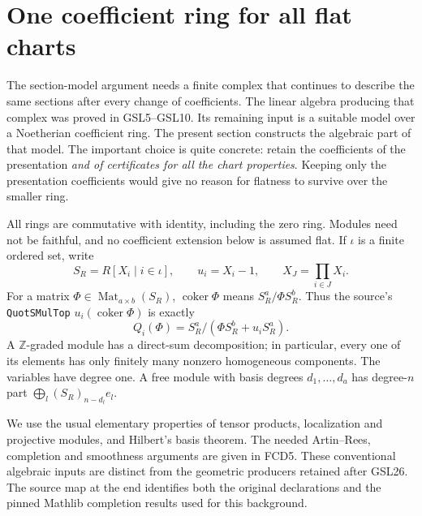 \section{One coefficient ring for all flat charts}
\label{sec:flat-chart-descent-v053}


The section-model argument needs a finite complex that continues to
describe the same sections after every change of coefficients.  The
linear algebra producing that complex was proved in GSL5--GSL10.  Its
remaining input is a suitable model over a Noetherian coefficient ring.
The present section constructs the algebraic part of that model.
The important choice is quite concrete: retain the coefficients of the
presentation \emph{and of certificates for all the chart properties}.
Keeping only the presentation coefficients would give no reason for
flatness to survive over the smaller ring.

All rings are commutative with identity, including the zero ring.
Modules need not be faithful, and no coefficient extension below is
assumed flat.  If $\iota$ is a finite ordered set, write
\[
 S_R=R[X_i\mid i\in\iota],\qquad
 u_i=X_i-1,\qquad X_J=\prod_{i\in J}X_i.
\]
For a matrix $\Phi\in\operatorname{Mat}_{a\times b}(S_R)$,
$\operatorname{coker}\Phi$ means
$S_R^a/\Phi S_R^b$.  Thus the source's
\texttt{QuotSMulTop} $u_i(\operatorname{coker}\Phi)$ is exactly
\[
 Q_i(\Phi)=S_R^a/(\Phi S_R^b+u_iS_R^a).                 \tag{FCD.1}\label{FCD.1}
\]
A $\mathbb Z$-graded module has a direct-sum decomposition; in
particular, every one of its elements has only finitely many nonzero
homogeneous components.  The variables have degree one.  A free
module with basis degrees $d_1,\ldots,d_a$ has degree-$n$ part
$\bigoplus_l(S_R)_{n-d_l}e_l$.

We use the usual elementary properties of tensor products, localization
and projective modules, and Hilbert's basis theorem.  The needed
Artin--Rees, completion and smoothness arguments are given in FCD5.
These conventional algebraic inputs are distinct from
the geometric producers retained after GSL26.  The source map at the
end identifies both the original declarations and the pinned Mathlib
completion results used for this background.

